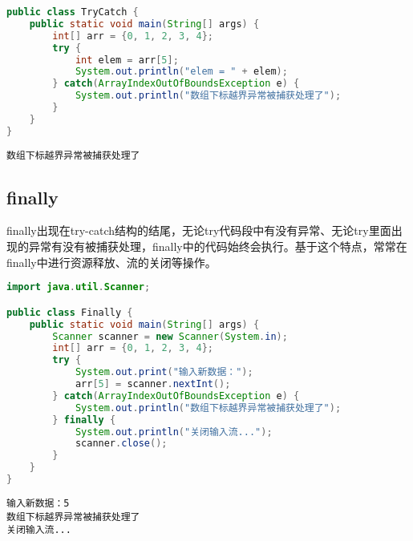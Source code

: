 
\begin{lstlisting}[language=Java]
public class TryCatch {
    public static void main(String[] args) {
        int[] arr = {0, 1, 2, 3, 4};
        try {
            int elem = arr[5];
            System.out.println("elem = " + elem);
        } catch(ArrayIndexOutOfBoundsException e) {
            System.out.println("数组下标越界异常被捕获处理了");
        }
    }
}
\end{lstlisting}

\begin{tcolorbox}
    \begin{verbatim}
数组下标越界异常被捕获处理了
	\end{verbatim}
\end{tcolorbox}

\vspace{0.5cm}

\subsection{finally}

finally出现在try-catch结构的结尾，无论try代码段中有没有异常、无论try里面出现的异常有没有被捕获处理，finally中的代码始终会执行。基于这个特点，常常在finally中进行资源释放、流的关闭等操作。\\


\begin{lstlisting}[language=Java]
import java.util.Scanner;

public class Finally {
    public static void main(String[] args) {
        Scanner scanner = new Scanner(System.in);
        int[] arr = {0, 1, 2, 3, 4};
        try {
            System.out.print("输入新数据：");
            arr[5] = scanner.nextInt();
        } catch(ArrayIndexOutOfBoundsException e) {
            System.out.println("数组下标越界异常被捕获处理了");
        } finally {
            System.out.println("关闭输入流...");
            scanner.close();
        }
    }
}
\end{lstlisting}

\begin{tcolorbox}
    \begin{verbatim}
输入新数据：5
数组下标越界异常被捕获处理了
关闭输入流...
	\end{verbatim}
\end{tcolorbox}

